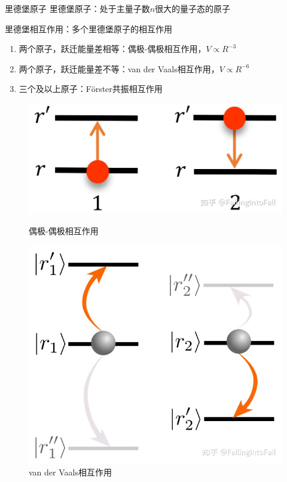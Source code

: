 \documentclass[10pt,aspectratio=43]{beamer}
\begin{document}
\begin{frame}{里德堡原子}
里德堡原子：处于主量子数$ n $很大的量子态的原子

里德堡相互作用：多个里德堡原子的相互作用
\begin{enumerate}
\item 两个原子，跃迁能量差相等：偶极-偶极相互作用，$ V\propto R^{-3} $
\item 两个原子，跃迁能量差不等：van der Vaals相互作用，$ V\propto R^{-6} $
\item 三个及以上原子：F\"orster共振相互作用
\end{enumerate}

\begin{figure}
\begin{minipage}{0.4\linewidth}
\centering
\includegraphics[width=\linewidth]{v-dd}
\caption{偶极-偶极相互作用}
\label{fig:v-dd}
\end{minipage}
\qquad
\begin{minipage}{0.4\linewidth}
\centering
\includegraphics[width=0.8\linewidth]{v-vdw}
\caption{van der Vaals相互作用}
\label{fig:v-vdw}
\end{minipage}
\end{figure}

\end{frame}
\end{document}
